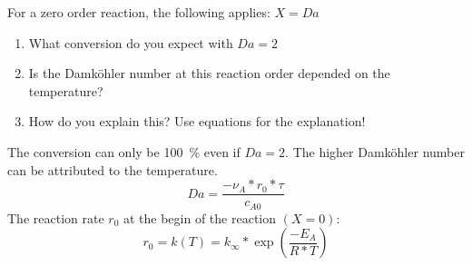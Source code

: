 \begin{question}
For a zero order reaction, the following applies: $X = Da$
\renewcommand{\labelenumi}{\alph{enumi})}
\begin{enumerate}
 \item What conversion do you expect with $Da = 2$
 \item Is the Damköhler number at this reaction order depended on the temperature?
 \item How do you explain this? Use equations for the explanation!
\end{enumerate}
\end{question}
\begin{pycode}

\end{pycode}
\begin{solution}
The conversion can only be \SI{100}{\percent} even if $Da = 2$. The higher Damköhler number can be attributed to the temperature.
\begin{equation}
Da = \frac{-\nu_A * r_0 * \tau}{c_{A0}}
\end{equation}
The reaction rate $r_0$ at the begin of the reaction $(X = 0)$:
\begin{equation}
r_0 = k(T) = k_{\infty} * \exp\left(\frac{-E_A}{R * T}\right)
\end{equation}
\end{solution}
